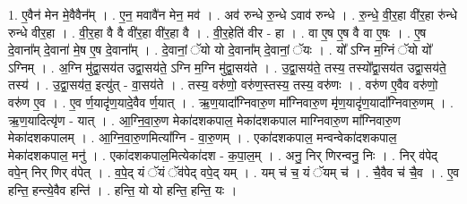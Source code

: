 \documentclass[17pt]{extarticle}
\begin{document}
1. ए॒वैन॑ मेन मे॒वैवैन᳚म् । . ए॒न॒ मवावै॑न मेन॒ मव॑ । . अव॑ रुन्धे रु॒न्धे ऽवाव॑ रुन्धे । . रु॒न्धे॒ वी॒र॒हा वी॑र॒हा रु॑न्धे रुन्धे वीर॒हा । . वी॒र॒हा वै वै वी॑र॒हा वी॑र॒हा वै । . वी॒र॒हेति॑ वीर - हा । . वा ए॒ष ए॒ष वै वा ए॒षः । . ए॒ष दे॒वाना᳚म् दे॒वाना॑ मे॒ष ए॒ष दे॒वाना᳚म् । . दे॒वानां॒ ॅयो यो दे॒वाना᳚म् दे॒वानां॒ ॅयः । . यो᳚ ऽग्नि म॒ग्निं ॅयो यो᳚ ऽग्निम् । . अ॒ग्नि मु॑द्वा॒सय॑त उद्वा॒सय॑ते॒ ऽग्नि म॒ग्नि मु॑द्वा॒सय॑ते । . उ॒द्वा॒सय॑ते॒ तस्य॒ तस्यो᳚द्वा॒सय॑त उद्वा॒सय॑ते॒ तस्य॑ । . उ॒द्वा॒सय॑त॒ इत्यु॑त् - वा॒सय॑ते । . तस्य॒ वरु॑णो॒ वरु॑ण॒स्तस्य॒ तस्य॒ वरु॑णः । . वरु॑ण ए॒वैव वरु॑णो॒ वरु॑ण ए॒व । . ए॒व र्ण॒यादृ॑ण॒यादे॒वैव र्ण॒यात् । . ऋ॒ण॒यादा᳚ग्निवारु॒ण मा᳚ग्निवारु॒ण मृ॑ण॒यादृ॑ण॒यादा᳚ग्निवारु॒णम् । . ऋ॒ण॒यादित्यृ॑ण - यात् । . आ॒ग्नि॒वा॒रु॒ण मेका॑दशकपाल॒ मेका॑दशकपाल माग्निवारु॒ण मा᳚ग्निवारु॒ण मेका॑दशकपालम् । . आ॒ग्नि॒वा॒रु॒णमित्या᳚ग्नि - वा॒रु॒णम् । . एका॑दशकपाल॒ मन्वन्वेका॑दशकपाल॒ मेका॑दशकपाल॒ मनु॑ । . एका॑दशकपाल॒मित्येका॑दश - क॒पा॒ल॒म् । . अनु॒ निर् णिरन्वनु॒ निः । . निर् व॑पेद् वपे॒न् निर् णिर् व॑पेत् । . व॒पे॒द् यं ॅयं ॅव॑पेद् वपे॒द् यम् । . यम् च॑ च॒ यं ॅयम् च॑ । . चै॒वैव च॑ चै॒व । . ए॒व हन्ति॒ हन्त्ये॒वैव हन्ति॑ । . हन्ति॒ यो यो हन्ति॒ हन्ति॒ यः । \newline
\end{document}
